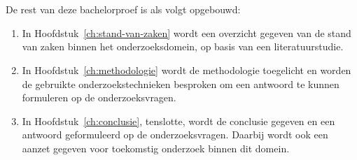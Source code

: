 \section{}%
\label{sec:Opzet-bachelorproef}



De rest van deze bachelorproef is als volgt opgebouwd:
\begin{enumerate}
  \item In Hoofdstuk~\ref{ch:stand-van-zaken} wordt een overzicht gegeven van de stand van zaken binnen het onderzoeksdomein, op basis van een literatuurstudie.
  \item In Hoofdstuk~\ref{ch:methodologie} wordt de methodologie toegelicht en worden de gebruikte onderzoekstechnieken besproken om een antwoord te kunnen formuleren op de onderzoeksvragen.
  
  \item In Hoofdstuk~\ref{ch:conclusie}, tenslotte, wordt de conclusie gegeven en een antwoord geformuleerd op de onderzoeksvragen. Daarbij wordt ook een aanzet gegeven voor toekomstig onderzoek binnen dit domein.
\end{enumerate}
